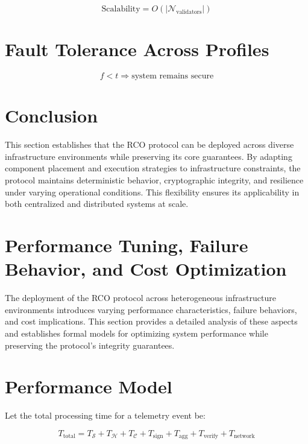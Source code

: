 \begin{equation}
\text{Scalability} = O(|\mathcal{N}_{\text{validators}}|)
\end{equation}

\section{Fault Tolerance Across Profiles}

\begin{equation}
f < t \Rightarrow \text{system remains secure}
\end{equation}

\section{Conclusion}

This section establishes that the RCO protocol can be deployed across diverse infrastructure environments while preserving its core guarantees. By adapting component placement and execution strategies to infrastructure constraints, the protocol maintains deterministic behavior, cryptographic integrity, and resilience under varying operational conditions. This flexibility ensures its applicability in both centralized and distributed systems at scale.

\section{Performance Tuning, Failure Behavior, and Cost Optimization}

The deployment of the RCO protocol across heterogeneous infrastructure environments introduces varying performance characteristics, failure behaviors, and cost implications. This section provides a detailed analysis of these aspects and establishes formal models for optimizing system performance while preserving the protocol's integrity guarantees.

\section{Performance Model}

Let the total processing time for a telemetry event be:

\begin{equation}
T_{\text{total}} = T_{\mathcal{S}} + T_{\mathcal{H}} + T_{\mathcal{C}} + T_{\text{sign}} + T_{\text{agg}} + T_{\text{verify}} + T_{\text{network}}
\end{equation}

